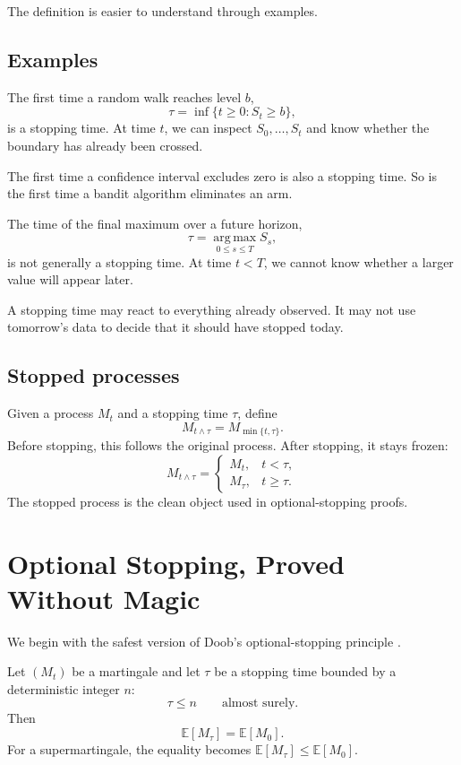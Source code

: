 \documentclass[en,nofont,11pt]{elegantbook}
\newcommand{\E}{\mathbb{E}}
\newcommand{\argmax}{\operatorname*{arg\,max}}
\begin{document}
The definition is easier to understand through examples.

\section{Examples}

The first time a random walk reaches level $b$,
\[
\tau=\inf\{t\ge 0:S_t\ge b\},
\]
is a stopping time. At time $t$, we can inspect $S_0,\ldots,S_t$ and know whether the boundary has already been crossed.

The first time a confidence interval excludes zero is also a stopping time. So is the first time a bandit algorithm eliminates an arm.

The time of the final maximum over a future horizon,
\[
\tau=\argmax_{0\le s\le T}S_s,
\]
is not generally a stopping time. At time $t<T$, we cannot know whether a larger value will appear later.

\begin{keyidea}
A stopping time may react to everything already observed. It may not use tomorrow's data to decide that it should have stopped today.
\end{keyidea}

\section{Stopped processes}

Given a process $M_t$ and a stopping time $\tau$, define
\[
M_{t\wedge\tau}
=
M_{\min\{t,\tau\}}.
\]
Before stopping, this follows the original process. After stopping, it stays frozen:
\[
M_{t\wedge\tau}
=
\begin{cases}
M_t, & t<\tau,\\
M_\tau, & t\ge\tau.
\end{cases}
\]
The stopped process is the clean object used in optional-stopping proofs.

\chapter{Optional Stopping, Proved Without Magic}

We begin with the safest version of Doob's optional-stopping principle \cite{doob1953stochastic,williams1991probability}.

\begin{resultbox}
Let $(M_t)$ be a martingale and let $\tau$ be a stopping time bounded by a deterministic integer $n$:
\[
\tau\le n\qquad\text{almost surely}.
\]
Then
\[
\E[M_\tau]=\E[M_0].
\]
For a supermartingale, the equality becomes $\E[M_\tau]\le\E[M_0]$.
\end{resultbox}
\end{document}
